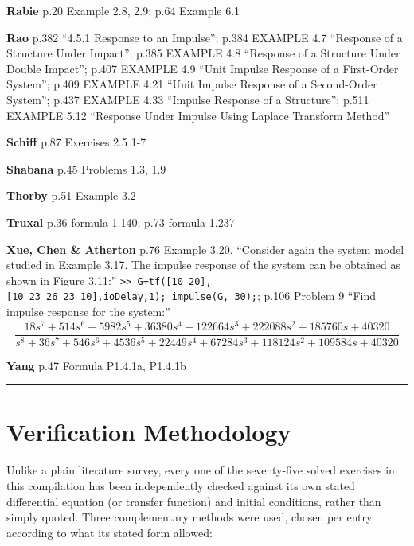 \documentclass[
  11pt,
]{article}
\begin{document}
\textbf{Rabie} p.20 Example 2.8, 2.9; p.64 Example 6.1

\textbf{Rao} p.382 ``4.5.1 Response to an Impulse''; p.384 EXAMPLE 4.7
``Response of a Structure Under Impact''; p.385 EXAMPLE 4.8 ``Response
of a Structure Under Double Impact''; p.407 EXAMPLE 4.9 ``Unit Impulse
Response of a First-Order System''; p.409 EXAMPLE 4.21 ``Unit Impulse
Response of a Second-Order System''; p.437 EXAMPLE 4.33 ``Impulse
Response of a Structure''; p.511 EXAMPLE 5.12 ``Response Under Impulse
Using Laplace Transform Method''

\textbf{Schiff} p.87 Exercises 2.5 1-7

\textbf{Shabana} p.45 Problems 1.3, 1.9

\textbf{Thorby} p.51 Example 3.2

\textbf{Truxal} p.36 formula 1.140; p.73 formula 1.237

\textbf{Xue, Chen \& Atherton} p.76 Example 3.20. ``Consider again the
system model studied in Example 3.17. The impulse response of the system
can be obtained as shown in Figure 3.11:''
\texttt{\textgreater{}\textgreater{}\ G=tf({[}10\ 20{]},{[}10\ 23\ 26\ 23\ 10{]},\textquotesingle{}ioDelay\textquotesingle{},1);\ impulse(G,\ 30);};
p.106 Problem 9 ``Find impulse response for the system:''
\[\frac{18s^7 + 514s^6 + 5982s^5 + 36380s^4 + 122664s^3 + 222088s^2 + 185760s + 40320}{s^8 + 36s^7 + 546s^6 + 4536s^5 + 22449s^4 + 67284s^3 + 118124s^2 + 109584s + 40320}\]

\textbf{Yang} p.47 Formula P1.4.1a, P1.4.1b

\begin{center}\rule{0.5\linewidth}{0.5pt}\end{center}

\hypertarget{verification-methodology}{%
\section{Verification Methodology}\label{verification-methodology}}

Unlike a plain literature survey, every one of the seventy-five solved
exercises in this compilation has been independently checked against its
own stated differential equation (or transfer function) and initial
conditions, rather than simply quoted. Three complementary methods were
used, chosen per entry according to what its stated form allowed:
\end{document}

